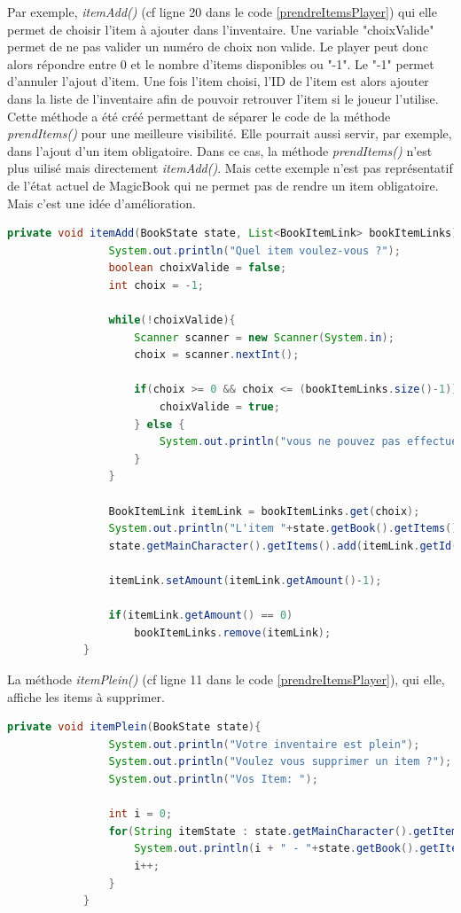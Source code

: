		Par exemple, \textit{itemAdd()} (cf ligne 20 dans le code \ref{prendreItemsPlayer}) qui elle permet de choisir l'item à ajouter dans l'inventaire. Une variable "choixValide" permet de ne pas valider un numéro de choix non valide. Le player peut donc alors répondre entre 0 et le nombre d'items disponibles ou "-1". Le "-1" permet d'annuler l'ajout d'item. Une fois l'item choisi, l'ID de l'item est alors ajouter dans la liste de l'inventaire afin de pouvoir retrouver l'item si le joueur l'utilise.\\
		Cette méthode a été créé permettant de séparer le code de la méthode \textit{prendItems()} pour une meilleure visibilité. Elle pourrait aussi servir, par exemple, dans l'ajout d'un item obligatoire. Dans ce cas, la méthode \textit{prendItems()} n'est plus uilisé mais directement \textit{itemAdd()}. Mais cette exemple n'est pas représentatif de l'état actuel de MagicBook qui ne permet pas de rendre un item obligatoire. Mais c'est une idée d'amélioration.\\

		\begin{lstlisting}[gobble=12, language=java, label=itemAdd, caption=itemAdd()]
			private void itemAdd(BookState state, List<BookItemLink> bookItemLinks){
				System.out.println("Quel item voulez-vous ?");
				boolean choixValide = false;
				int choix = -1;

				while(!choixValide){
					Scanner scanner = new Scanner(System.in);
					choix = scanner.nextInt();

					if(choix >= 0 && choix <= (bookItemLinks.size()-1)){
						choixValide = true;
					} else {
						System.out.println("vous ne pouvez pas effectuer ce choix");
					}
				}

				BookItemLink itemLink = bookItemLinks.get(choix);
				System.out.println("L'item "+state.getBook().getItems().get(itemLink.getId()).getName()+" a été rajouté");
				state.getMainCharacter().getItems().add(itemLink.getId());

				itemLink.setAmount(itemLink.getAmount()-1);

				if(itemLink.getAmount() == 0)
					bookItemLinks.remove(itemLink);
			}

		\end{lstlisting}

		La méthode \textit{itemPlein()} (cf ligne 11 dans le code \ref{prendreItemsPlayer}), qui elle, affiche les items à supprimer.

		\begin{lstlisting}[gobble=12, language=java, label=itemPlein, caption=itemPlein()]
			private void itemPlein(BookState state){
				System.out.println("Votre inventaire est plein");
				System.out.println("Voulez vous supprimer un item ?");
				System.out.println("Vos Item: ");

				int i = 0;
				for(String itemState : state.getMainCharacter().getItems()){
					System.out.println(i + " - "+state.getBook().getItems().get(itemState));
					i++;
				}
			}
		\end{lstlisting}

